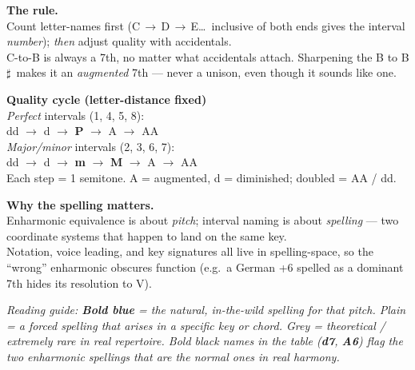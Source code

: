 \documentclass[12pt,letterpaper]{article}
\newcommand{\sh}{$\sharp$}
\newcommand{\nat}[1]{{\color{naturalcol}\bfseries #1}}     %
\newcommand{\rare}[1]{{\color{rarecol}#1}}                  %
\begin{document}
\begin{minipage}[t]{0.32\linewidth}
\colorbox{bandcol}{%
\begin{minipage}{0.95\linewidth}\vspace{1mm}
\textbf{The rule.}\\[1pt]
Count letter-names first (C\,$\to$\,D\,$\to$\,E\dots\ inclusive of both ends gives the interval \emph{number}); \emph{then} adjust quality with accidentals.\\[2pt]
C-to-B is always a 7th, no matter what accidentals attach. Sharpening the B to B\sh\ makes it an \emph{augmented} 7th --- never a unison, even though it sounds like one.
\vspace{1mm}\end{minipage}}
\end{minipage}\hfill
\begin{minipage}[t]{0.32\linewidth}
\colorbox{bandcol}{%
\begin{minipage}{0.95\linewidth}\vspace{1mm}
\textbf{Quality cycle (letter-distance fixed)}\\[1pt]
\emph{Perfect} intervals (1, 4, 5, 8):\\
\quad dd $\to$ d $\to$ \textbf{P} $\to$ A $\to$ AA\\[2pt]
\emph{Major/minor} intervals (2, 3, 6, 7):\\
\quad dd $\to$ d $\to$ \textbf{m} $\to$ \textbf{M} $\to$ A $\to$ AA\\[2pt]
Each step = 1 semitone. A = augmented, d = diminished; doubled = AA / dd.
\vspace{1mm}\end{minipage}}
\end{minipage}\hfill
\begin{minipage}[t]{0.32\linewidth}
\colorbox{bandcol}{%
\begin{minipage}{0.95\linewidth}\vspace{1mm}
\textbf{Why the spelling matters.}\\[1pt]
Enharmonic equivalence is about \emph{pitch}; interval naming is about \emph{spelling} --- two coordinate systems that happen to land on the same key.\\[2pt]
Notation, voice leading, and key signatures all live in spelling-space, so the ``wrong'' enharmonic obscures function (e.g.\ a German +6 spelled as a dominant 7th hides its resolution to V).
\vspace{1mm}\end{minipage}}
\end{minipage}

\vspace{1.5mm}
{\small\itshape Reading guide: \nat{Bold blue} = the natural, in-the-wild spelling for that pitch. Plain = a forced spelling that arises in a specific key or chord. \rare{Grey} = theoretical / extremely rare in real repertoire. Bold black names in the table (\textbf{d7}, \textbf{A6}) flag the two enharmonic spellings that are the \emph{normal} ones in real harmony.}
\end{document}
